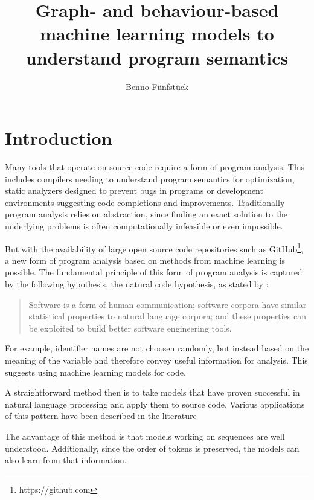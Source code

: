 \documentclass[sigconf,authordraft=true,nonacm=true]{acmart}
\begin{document}
\title{Graph- and behaviour-based machine learning models to understand program semantics}
\author{Benno Fünfstück}

\begin{abstract}
 
\end{abstract}

\maketitle

\section{Introduction}

Many tools that operate on source code require a form of program analysis.
This includes compilers needing to understand program semantics for optimization,
static analyzers designed to prevent bugs in programs
or development environments suggesting code completions and improvements.
Traditionally program analysis relies on abstraction, since finding an exact solution to the underlying problems is often computationally infeasible or even impossible.

But with the availability of large open source code repositories such as GitHub\footnote{https://github.com}, a new form of program analysis based on methods from machine learning is possible.
The fundamental principle of this form of program analysis is captured by the following hypothesis, the natural code hypothesis, as stated by \citet{allamanis_survey_2018}:
\begin{quote}
Software is a form of human communication;
software corpora have similar statistical properties to natural language corpora;
and these properties can be exploited to build better software engineering tools.
\end{quote}
For example, identifier names are not choosen randomly, but instead based on the meaning of the variable and therefore convey useful information for analysis.
This suggests using machine learning models for code.

A straightforward method then is to take models that have proven successful in natural language processing and apply them to source code.
Various applications of this pattern have been described in the literature \cite{ahmad_transformer-based_2020}

The advantage of this method is that models working on sequences are well understood.
Additionally, since the order of tokens is preserved, the models can also learn from that information.
\end{document}
